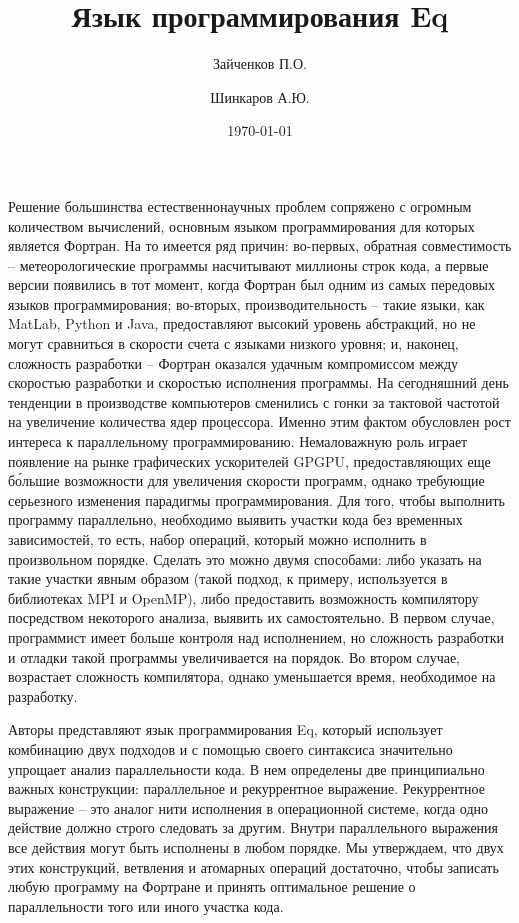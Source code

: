 \documentclass[a4paper]{llncs}
\author{Зайченков П.О.\inst{1} \and Шинкаров А.Ю.\inst{2}}
\date{\today}
\title{Язык программирования Eq}
\institute{
  Московский физико-технический институт,
  Кафедра информатики и вычислительной техники
\and
  University of Hertfordshire,
  Hatfield, Hertfordshire,
  AL10 9AB, United Kingdom
}
\begin{document}
\maketitle

Решение большинства естественнонаучных проблем сопряжено с огромным количеством вычислений, основным языком программирования для которых является Фортран. На то имеется ряд причин: во-первых, обратная совместимость -- метеорологические программы насчитывают миллионы строк кода, а первые версии появились в тот момент, когда Фортран был одним из самых передовых языков программирования; во-вторых, производительность -- такие языки, как MatLab, Python и Java, предоставляют высокий уровень абстракций, но не могут сравниться в скорости счета с языками низкого уровня; и, наконец, сложность разработки -- Фортран оказался удачным компромиссом между скоростью разработки и скоростью исполнения программы. На сегодняшний день тенденции в производстве компьютеров сменились с гонки за тактовой частотой на увеличение количества ядер процессора. Именно этим фактом обусловлен рост интереса к параллельному программированию. Немаловажную роль играет появление на рынке графических ускорителей GPGPU, предоставляющих еще б\'{о}льшие возможности для увеличения скорости программ, однако требующие серьезного изменения парадигмы программирования. Для того, чтобы выполнить программу параллельно, необходимо выявить участки кода без временных зависимостей, то есть, набор операций, который можно исполнить в произвольном порядке. Сделать это можно двумя способами: либо указать на такие участки явным образом (такой подход, к примеру, используется в библиотеках MPI и OpenMP), либо предоставить возможность компилятору  посредством некоторого анализа, выявить их самостоятельно. В первом случае, программист имеет больше контроля над исполнением, но сложность разработки и отладки такой программы увеличивается на порядок. Во втором случае, возрастает сложность компилятора, однако уменьшается время, необходимое на разработку.

Авторы представляют язык программирования Eq, который использует комбинацию двух подходов и с помощью своего синтаксиса значительно упрощает анализ параллельности кода. В нем определены две принципиально важных конструкции: параллельное и рекуррентное выражение. Рекуррентное выражение -- это аналог нити исполнения в операционной системе, когда одно действие должно строго следовать за другим. Внутри параллельного выражения все действия могут быть исполнены в любом порядке. Мы утверждаем, что двух этих конструкций, ветвления и атомарных операций достаточно, чтобы записать любую программу на Фортране и принять оптимальное решение о параллельности того или иного участка кода.
\end{document}
